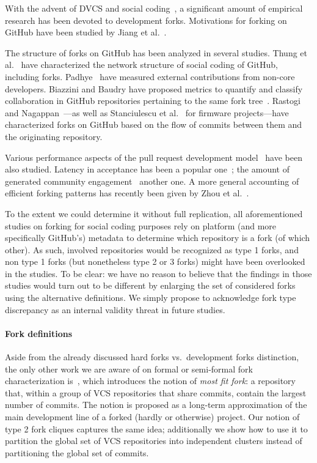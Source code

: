 With the advent of DVCS and social coding~\cite{lima2014ghsocial}, a
significant amount of empirical research has been devoted to development
forks. Motivations for forking on GitHub have been studied by Jiang et
al.~\cite{jiang2017whyfork}.

The structure of forks on GitHub has been analyzed in several studies. Thung et
al.~\cite{thung2013network} have characterized the network structure of social
coding of GitHub, including forks. Padhye~\cite{padhye2014extcontrib} have
measured external contributions from non-core developers. Biazzini and Baudry
have proposed metrics to quantify and classify collaboration in GitHub
repositories pertaining to the same fork tree~\cite{biazzini2014maythefork}.
Rastogi and Nagappan~\cite{rastogi2016forking}---as well as Stanciulescu et
al.~\cite{stuanciulescu2015forked} for firmware projects---have characterized
forks on GitHub based on the flow of commits between them and the originating
repository.

Various performance aspects of the pull request development
model~\cite{gousios2014pullrequests, gousios2015work} have been also
studied. Latency in acceptance has been a popular one~\cite{yu2015waitforit,
  tsay2014influence}; the amount of generated community
engagement~\cite{dabbish2012socialcoding, dabbish2012transparency} another one.
A more general accounting of efficient forking patterns has recently been given
by Zhou et al.~\cite{zhou2019fork}.

To the extent we could determine it without full replication, all
aforementioned studies on forking for social coding purposes rely on platform
(and more specifically GitHub's) metadata to determine which repository is a
fork (of which other). As such, involved repositories would be recognized as
type 1 forks, and non type 1 forks (but nonetheless type 2 or 3 forks) might
have been overlooked in the studies. To be clear: we have no reason to believe
that the findings in those studies would turn out to be different by enlarging
the set of considered forks using the alternative definitions. We simply
propose to acknowledge fork type discrepancy as an internal validity threat in
future studies.


\paragraph{Fork definitions}

Aside from the already discussed hard forks vs.\ development forks distinction,
the only other work we are aware of on formal or semi-formal fork
characterization is~\cite{swh-provenance-emse}, which introduces the notion of
\emph{most fit fork}: a repository that, within a group of VCS repositories
that share commits, contain the largest number of commits. The notion is
proposed as a long-term approximation of the main development line of a forked
(hardly or otherwise) project. Our notion of type 2 fork cliques captures the
same idea; additionally we show how to use it to partition the global set of
VCS repositories into independent clusters instead of partitioning the global
set of commits.


